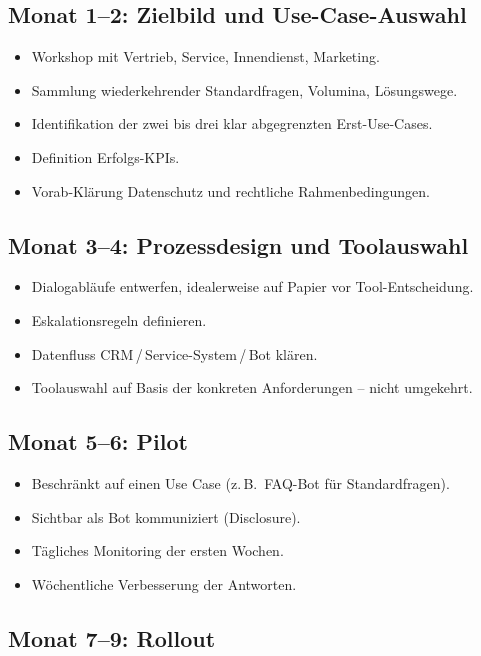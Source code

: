 \documentclass[11pt,a4paper,oneside]{article}
\begin{document}
\subsection{Monat 1--2: Zielbild und Use-Case-Auswahl}

\begin{itemize}
  \item Workshop mit Vertrieb, Service, Innendienst, Marketing.
  \item Sammlung wiederkehrender Standardfragen, Volumina, Lösungswege.
  \item Identifikation der zwei bis drei klar abgegrenzten Erst-Use-Cases.
  \item Definition Erfolgs-KPIs.
  \item Vorab-Klärung Datenschutz und rechtliche Rahmenbedingungen.
\end{itemize}

\subsection{Monat 3--4: Prozessdesign und Toolauswahl}

\begin{itemize}
  \item Dialogabläufe entwerfen, idealerweise auf Papier vor Tool-Entscheidung.
  \item Eskalationsregeln definieren.
  \item Datenfluss CRM\,/\,Service-System\,/\,Bot klären.
  \item Toolauswahl auf Basis der konkreten Anforderungen -- nicht umgekehrt.
\end{itemize}

\subsection{Monat 5--6: Pilot}

\begin{itemize}
  \item Beschränkt auf einen Use Case (z.\,B.\ FAQ-Bot für Standardfragen).
  \item Sichtbar als Bot kommuniziert (Disclosure).
  \item Tägliches Monitoring der ersten Wochen.
  \item Wöchentliche Verbesserung der Antworten.
\end{itemize}

\subsection{Monat 7--9: Rollout}
\end{document}
